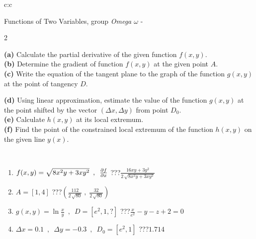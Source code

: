 \documentclass[10pt]{report}
\begin{document}
\begin{tabular}{c:c}
\begin{minipage}[c][104.5mm][t]{0.5\linewidth}
\begin{center}
\vspace{7mm}
{\huge \LARGE Functions of Two Variables, group \textit{Omega $\omega$} -}\\[5mm]
\begin{minipage}{0.95\linewidth}
\begin{center}
{\small \begin{multicols}{2} \raggedright
\textbf{(a)} Calculate the partial derivative of the given function \(f(x,y)\). \\[1mm]
\textbf{(b)} Determine the gradient of function \(f(x,y)\) at the given point \(A\). \\[1mm]
\textbf{(c)} Write the equation of the tangent plane to the graph of the function \(g(x,y)\) at the point of tangency \(D\). \par \columnbreak
\textbf{(d)} Using linear approximation, estimate the value of the function \(g(x,y)\) at the point shifted by the vector \((\Delta x, \Delta y)\) from point \(D_0\). \\[1mm]
\textbf{(e)} Calculate \(h(x,y)\) at its local extremum. \\[1mm]
\textbf{(f)} Find the point of the constrained local extremum of the function \(h(x,y)\) on the given line \(y(x)\). \\[1mm]
\end{multicols}
}
\end{center}
\end{minipage}
\\[4mm]
\begin{minipage}{0.79\linewidth}
\begin{center}
\begin{varwidth}{\linewidth}
\begin{enumerate}
\normalsizerr
\item $f(x,y) = \sqrt{8x^2y + 3xy^2}\enspace , \enspace \pdv{f}{x}$\quad \dotfill\; ???\;\dotfill \quad $\frac{16xy+3y^2}{2\,\sqrt{8x^2y+3xy^2}}$
\item $A = [1, 4]$\quad \dotfill\; ???\;\dotfill \quad $\left( \frac{112}{2\,\sqrt{80}} \;,\; \frac{32}{2\,\sqrt{80}} \right)$
\item $g(x,y) = \ln\frac{x}{y} \enspace , \enspace D=[e^{2},1,?]$\quad \dotfill\; ???\;\dotfill \quad $\frac{x}{e^2} - y - z + 2 = 0$
\item $\Delta x = {0.1} \enspace,\enspace \Delta y = {-0.3} \enspace,\enspace D_0 = [e^{2},1]$\quad \dotfill\; ???\;\dotfill \quad $1.714$

\end{enumerate}
\end{varwidth}
\end{center}
\end{minipage}
\end{center}
\end{minipage}
\end{tabular}
\end{document}
